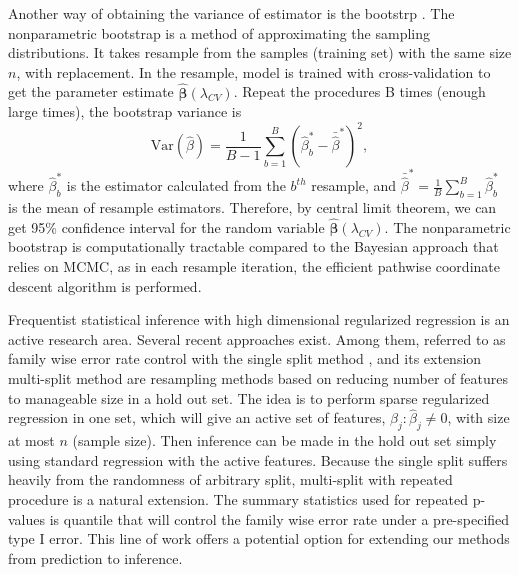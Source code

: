 Another way of obtaining the variance of estimator is the bootstrp \citep{efron1979bootstrap}. The nonparametric bootstrap is a method of approximating the sampling distributions. It takes resample from the samples (training set) with the same size $n$, with replacement. In the resample, model is trained with cross-validation to get the parameter estimate $\hat{\bm{\beta}}(\lambda_{CV})$. Repeat the procedures B times (enough large times), the bootstrap variance is 
\begin{displaymath}
\text{Var}(\hat{\beta})=\frac{1}{B-1}\sum_{b=1}^B(\hat{\beta}_b^*-\bar{\hat{\beta}}^*)^2,
\end{displaymath}
where $\hat{\beta}_b^*$ is the estimator calculated from the $b^{th}$ resample, and $\bar{\hat{\beta}}^* = \frac{1}{B}\sum_{b=1}^B\hat{\beta}_b^*$ is the mean of resample estimators. Therefore, by central limit theorem, we can get 95\% confidence interval for the random variable $\hat{\bm{\beta}}(\lambda_{CV})$. The nonparametric bootstrap is computationally tractable compared to the Bayesian approach that relies on MCMC, as in each resample iteration, the efficient pathwise coordinate descent algorithm is performed.

Frequentist statistical inference with high dimensional regularized regression is an active research area. Several  recent approaches exist. Among them, referred to as family wise error rate control with the single split method \citep{wasserman2009high}, and its extension multi-split method \citep{meinshausen2009p} are resampling methods based on reducing number of features to manageable size in a hold out set. The idea is to perform sparse regularized regression in one set, which will give an active set of features, $\beta_j:\hat{\beta}_j\neq 0$, with size at most $n$ (sample size). Then inference can be made in the hold out set simply using standard regression with the active features. Because the single split suffers heavily from the randomness of arbitrary split, multi-split with repeated procedure is a natural extension. The summary statistics used for repeated p-values is quantile that will control the family wise error rate under a pre-specified type I error. This line of work offers a potential option for extending our methods from prediction to inference.      
